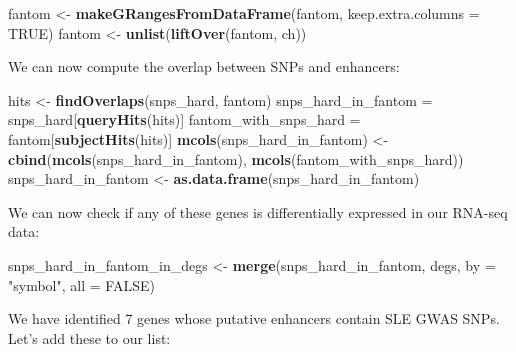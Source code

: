 \documentclass[9pt,a4paper,]{extarticle}
\newenvironment{Shaded}{\begin{snugshade}}{\end{snugshade}}
\newcommand{\KeywordTok}[1]{\textcolor[rgb]{0.13,0.29,0.53}{\textbf{#1}}}
\newcommand{\DataTypeTok}[1]{\textcolor[rgb]{0.13,0.29,0.53}{#1}}
\newcommand{\StringTok}[1]{\textcolor[rgb]{0.31,0.60,0.02}{#1}}
\newcommand{\OtherTok}[1]{\textcolor[rgb]{0.56,0.35,0.01}{#1}}
\newcommand{\NormalTok}[1]{#1}
\theoremstyle{definition}
\theoremstyle{definition}
\theoremstyle{definition}
\theoremstyle{remark}
\begin{document}
\begin{Shaded}
\begin{Highlighting}[]
\NormalTok{fantom <-}\StringTok{ }\KeywordTok{makeGRangesFromDataFrame}\NormalTok{(fantom, }\DataTypeTok{keep.extra.columns =} \OtherTok{TRUE}\NormalTok{)}
\NormalTok{fantom <-}\StringTok{ }\KeywordTok{unlist}\NormalTok{(}\KeywordTok{liftOver}\NormalTok{(fantom, ch))}
\end{Highlighting}
\end{Shaded}

We can now compute the overlap between SNPs and enhancers:

\begin{Shaded}
\begin{Highlighting}[]
\NormalTok{hits <-}\StringTok{ }\KeywordTok{findOverlaps}\NormalTok{(snps_hard, fantom)}
\NormalTok{snps_hard_in_fantom =}\StringTok{ }\NormalTok{snps_hard[}\KeywordTok{queryHits}\NormalTok{(hits)]}
\NormalTok{fantom_with_snps_hard =}\StringTok{ }\NormalTok{fantom[}\KeywordTok{subjectHits}\NormalTok{(hits)]}
\KeywordTok{mcols}\NormalTok{(snps_hard_in_fantom) <-}\StringTok{ }\KeywordTok{cbind}\NormalTok{(}\KeywordTok{mcols}\NormalTok{(snps_hard_in_fantom), }\KeywordTok{mcols}\NormalTok{(fantom_with_snps_hard))}
\NormalTok{snps_hard_in_fantom <-}\StringTok{ }\KeywordTok{as.data.frame}\NormalTok{(snps_hard_in_fantom)}
\end{Highlighting}
\end{Shaded}

We can now check if any of these genes is differentially expressed in our RNA-seq data:

\begin{Shaded}
\begin{Highlighting}[]
\NormalTok{snps_hard_in_fantom_in_degs <-}\StringTok{ }\KeywordTok{merge}\NormalTok{(snps_hard_in_fantom, degs, }\DataTypeTok{by =} \StringTok{"symbol"}\NormalTok{, }\DataTypeTok{all =} \OtherTok{FALSE}\NormalTok{)}
\end{Highlighting}
\end{Shaded}

We have identified 7 genes whose putative enhancers contain SLE GWAS SNPs.
Let's add these to our list:
\end{document}
